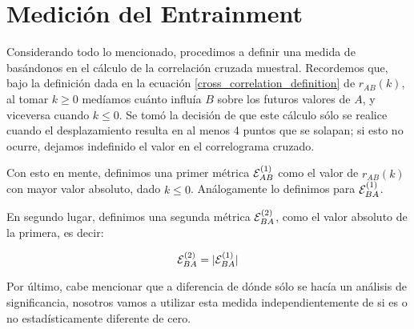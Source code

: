 \section{Medición del Entrainment}
\label{sec:method_entrainment}

Considerando todo lo mencionado, procedimos a definir una medida de \entrainment basándonos en el cálculo de la correlación cruzada muestral. Recordemos que, bajo la definición dada en la ecuación \ref{cross_correlation_definition} de $r_{AB}(k)$, al tomar $k \geq 0$ medíamos cuánto influía $B$ sobre los futuros valores de $A$, y viceversa cuando $k \leq 0$. Se tomó la decisión de que este cálculo sólo se realice cuando el desplazamiento resulta en al menos 4 puntos que se solapan; si esto no ocurre, dejamos indefinido el valor en el correlograma cruzado.

Con esto en mente, definimos una primer métrica $\mathcal{E}_{AB}^{(1)}$ como el valor de $r_{AB}(k)$ con mayor valor absoluto, dado $k \leq 0$. Análogamente lo definimos para $\mathcal{E}_{BA}^{(1)}$.

En segundo lugar, definimos una segunda métrica $\mathcal{E}_{BA}^{(2)}$, como el valor absoluto de la primera, es decir:

\begin{equation}
\mathcal{E}_{BA}^{(2)} = |\mathcal{E}_{BA}^{(1)}|
\end{equation}

Por último, cabe mencionar que a diferencia de \cite{KOU2008.2} dónde sólo se hacía un análisis de significancia, nosotros vamos a utilizar esta medida independientemente de si es o no estadísticamente diferente de cero.

